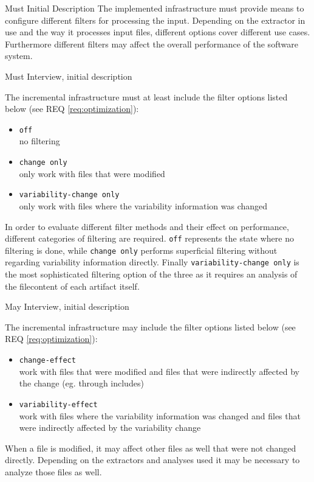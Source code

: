 \documentclass[a4paper]{article}
\begin{document}
\clearpage
\begin{req} \label{req:optimization}
\reqtable
	{Must}  {Initial Description}
	{
	The implemented infrastructure must provide means to configure different filters for processing the input.
    }
	{Depending on the extractor in use and the way it processes input files, different options cover different use cases. Furthermore different filters may affect the overall performance of the software system.}

\begin{subreq}\label{req:mandatory-filters}
    \reqtable
	{Must}  {Interview, initial description}
	{
	The incremental infrastructure must at least include the filter options listed below (see REQ \ref{req:optimization}):
	\begin{itemize}
		\item \texttt{off} \\
		no filtering 
	    \item \texttt{change only} \\
	    only work with files that were modified
	    \item \texttt{variability-change only} \\
	     only work with files where the variability information was changed
	\end{itemize}
    }
	{In order to evaluate different filter methods and their effect on performance, different categories of filtering are required. \texttt{off} represents the state where no filtering is done, while \texttt{change only} performs superficial filtering without regarding variability information directly. Finally \texttt{variability-change only} is the most sophisticated filtering option of the three as it requires an analysis of the filecontent of each artifact itself.}
\end{subreq}

\begin{subreq} \label{req:effect-filters}
    \reqtable
	{May}  {Interview, initial description}
	{
	The incremental infrastructure may include the filter options listed below (see REQ \ref{req:optimization}):
	\begin{itemize}
		\item \texttt{change-effect} \\
		work with files that were modified and files that were indirectly affected by the change (eg. through includes)
	    \item \texttt{variability-effect}  \\
	    work with files where the variability information was changed and files that were indirectly affected by the variability change
	\end{itemize}
    }
	{When a file is modified, it may affect other files as well that were not changed directly. Depending on the extractors and analyses used it may be necessary to analyze those files as well.}
\end{subreq}

\end{req}
\end{document}
